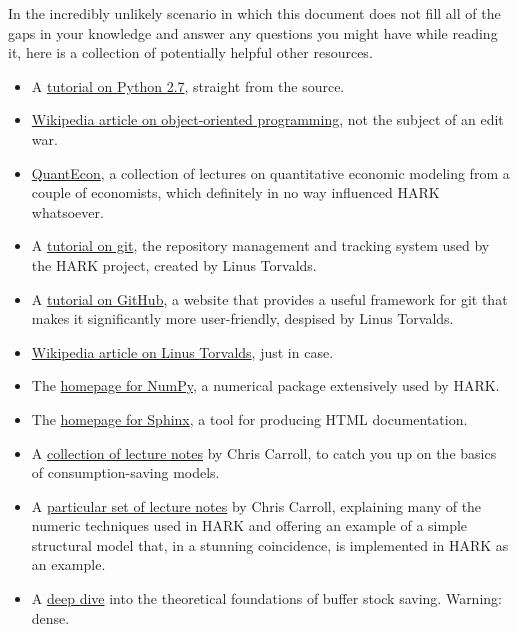 \documentclass[12pt,titlepage,letterpaper]{econtex}
\begin{document}
In the incredibly unlikely scenario in which this document does not fill all of the gaps in your knowledge and answer any questions you might have while reading it, here is a collection of potentially helpful other resources.

\begin{itemize}

\item A \href{https://docs.python.org/2.7/tutorial/}{tutorial on Python 2.7}, straight from the source.

\item \href{https://en.wikipedia.org/wiki/Object-oriented_programming}{Wikipedia article on object-oriented programming}, not the subject of an edit war.

\item \href{http://quant-econ.net/}{QuantEcon}, a collection of lectures on quantitative economic modeling from a couple of economists, which definitely in no way influenced HARK whatsoever.

\item A \href{https://www.atlassian.com/git/tutorials/}{tutorial on git}, the repository management and tracking system used by the HARK project, created by Linus Torvalds.

\item A \href{https://guides.github.com/activities/hello-world/}{tutorial on GitHub}, a website that provides a useful framework for git that makes it significantly more user-friendly, despised by Linus Torvalds.

\item \href{https://en.wikipedia.org/wiki/Linus_Torvalds}{Wikipedia article on Linus Torvalds}, just in case.

\item The \href{http://www.numpy.org/}{homepage for NumPy}, a numerical package extensively used by HARK.

\item The \href{http://www.sphinx-doc.org/}{homepage for Sphinx}, a tool for producing HTML documentation.

\item A \href{http://www.econ2.jhu.edu/people/ccarroll/public/lecturenotes/Consumption/}{collection of lecture notes} by Chris Carroll, to catch you up on the basics of consumption-saving models.

\item A \href{http://www.econ2.jhu.edu/people/ccarroll/SolvingMicroDSOPs/}{particular set of lecture notes} by Chris Carroll, explaining many of the numeric techniques used in HARK and offering an example of a simple structural model that, in a stunning coincidence, is implemented in HARK as an example.

\item A \href{http://www.econ2.jhu.edu/people/ccarroll/BufferStockTheory.pdf}{deep dive} into the theoretical foundations of buffer stock saving.  Warning: dense.

\end{itemize}
\end{document}
